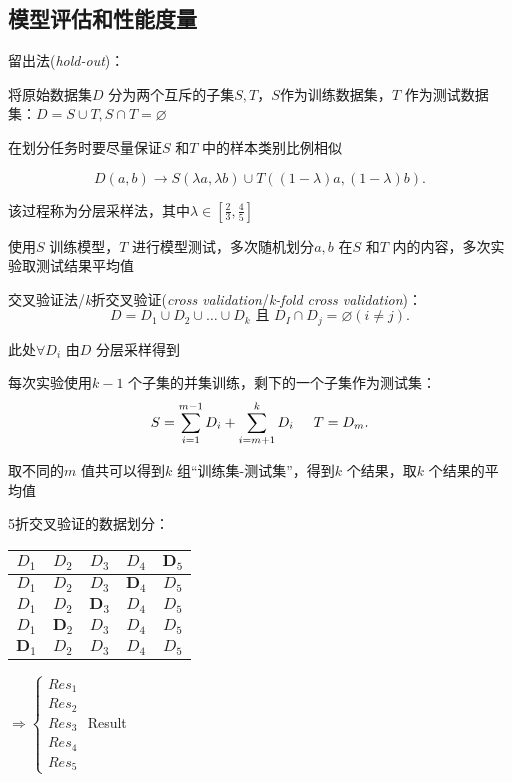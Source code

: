 \subsection{模型评估和性能度量}%
\label{sub:模型评估和性能度量}
\begin{notation}
    留出法(\textit{hold-out})：

    将原始数据集$D$ 分为两个互斥的子集$S,T$，$S$作为训练数据集，$T$ 作为测试数据集：$D=S\cup T,S\cap T=\varnothing $
\end{notation}
在划分任务时要尽量保证$S$ 和$T$ 中的样本类别比例相似
\begin{eg}
    \[
        D\left( a,b \right)  \to S\left( \lambda a,\lambda b \right) \cup T\left( \left( 1-\lambda \right) a,\left( 1-\lambda \right) b \right)
    .\] 

    该过程称为分层采样法，其中$\lambda\in [\frac{2}{3} , \frac{4}{5} ]$

    使用$S$ 训练模型，$T$ 进行模型测试，多次随机划分$a,b$ 在$S$ 和$T$ 内的内容，多次实验取测试结果平均值
\end{eg}
\begin{notation}
    交叉验证法/\textit{k}折交叉验证(\textit{cross validation}/\textit{k-fold cross validation})：\[
        D=D_1\cup D_2\cup \ldots\cup D_k\text{ 且 }D_I\cap D_j=\varnothing \left( i\neq j \right)
    .\]   

    此处$\forall D_i$ 由$D$ 分层采样得到

    每次实验使用$k-1$ 个子集的并集训练，剩下的一个子集作为测试集：\[
        S=\sum_{i=1}^{m-1} D_i + \sum_{i=m+1}^{k}D_i \hspace{0.5cm} T=D_m
    .\] 

    取不同的$m$ 值共可以得到$k$ 组“训练集-测试集”，得到$k$ 个结果，取$k$ 个结果的平均值
\end{notation}
\begin{eg}
    5折交叉验证的数据划分：
    \begin{table}[htpb]
        \centering
        \begin{tabular}{|c|c|c|c|c|}
        \hline
        $D_1$ & $D_2$ & $D_3$ & $D_4$ & $\bm{D}_5$ \\
        \hline
        $D_1$ & $D_2$ & $D_3$ & $\bm{D}_4$ & $D_5$ \\
        \hline
        $D_1$ & $D_2$ & $\bm{D}_3$ & $D_4$ & $D_5$ \\
        \hline
        $D_1$ & $\bm{D}_2$ & $D_3$ & $D_4$ & $D_5$ \\
        \hline
        $\bm{D}_1$ & $D_2$ & $D_3$ & $D_4$ & $D_5$ \\
        \hline
        \end{tabular}
        $\Rightarrow \begin{cases}
            Res_1\\
            Res_2\\
            Res_3\\
            Res_4\\
            Res_5
        \end{cases}$
        \ce{->[Avg.]}Result
    \end{table}
\end{eg}
